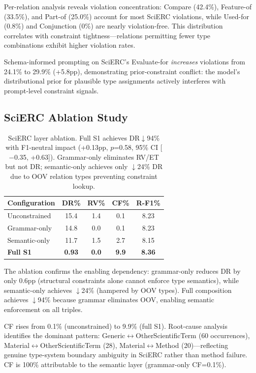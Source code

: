 \documentclass[11pt]{article}
\begin{document}
Per-relation analysis reveals violation concentration: Compare (42.4\%), Feature-of (33.5\%), and Part-of (25.0\%) account for most SciERC violations, while Used-for (0.8\%) and Conjunction (0\%) are nearly violation-free. This distribution correlates with constraint tightness---relations permitting fewer type combinations exhibit higher violation rates.

Schema-informed prompting on SciERC's Evaluate-for \emph{increases} violations from 24.1\% to 29.9\% (+5.8pp), demonstrating prior-constraint conflict: the model's distributional prior for plausible type assignments actively interferes with prompt-level constraint signals.

\subsection{SciERC Ablation Study}
\label{sec:scierc}

\begin{table}[t]
\centering
\small
\begin{tabular}{lcccc}
\toprule
\textbf{Configuration} & \textbf{DR\%} & \textbf{RV\%} & \textbf{CF\%} & \textbf{R-F1\%} \\
\midrule
Unconstrained & 15.4 & 1.4 & 0.1 & 8.23 \\
Grammar-only & 14.8 & 0.0 & 0.1 & 8.23 \\
Semantic-only & 11.7 & 1.5 & 2.7 & 8.15 \\
\textbf{Full S1} & \textbf{0.93} & \textbf{0.0} & \textbf{9.9} & \textbf{8.36} \\
\bottomrule
\end{tabular}
\caption{SciERC layer ablation. Full S1 achieves DR$\downarrow$94\% with F1-neutral impact (+0.13pp, $p$=0.58, 95\% CI [$-$0.35, +0.63]). Grammar-only eliminates RV/ET but not DR; semantic-only achieves only $\downarrow$24\% DR due to OOV relation types preventing constraint lookup.}
\label{tab:scierc}
\end{table}

The ablation confirms the enabling dependency: grammar-only reduces DR by only 0.6pp (structural constraints alone cannot enforce type semantics), while semantic-only achieves $\downarrow$24\% (hampered by OOV types). Full composition achieves $\downarrow$94\% because grammar eliminates OOV, enabling semantic enforcement on all triples.

CF rises from 0.1\% (unconstrained) to 9.9\% (full S1). Root-cause analysis identifies the dominant pattern: Generic$\leftrightarrow$OtherScientificTerm (60 occurrences), Material$\leftrightarrow$OtherScientificTerm (28), Material$\leftrightarrow$Method (20)---reflecting genuine type-system boundary ambiguity in SciERC rather than method failure. CF is 100\% attributable to the semantic layer (grammar-only CF=0.1\%).
\end{document}
